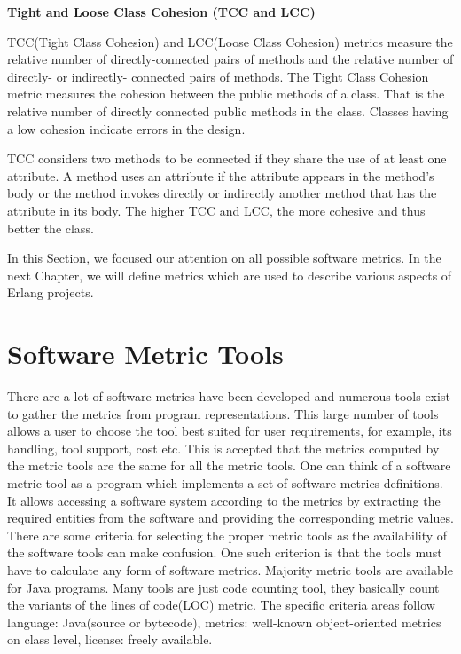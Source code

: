 \textbf{Tight and Loose Class Cohesion (TCC and LCC)}

TCC(Tight Class Cohesion) and LCC(Loose Class Cohesion) metrics measure the relative number of directly-connected pairs of methods and the relative number of directly- or indirectly- connected pairs of methods.
The Tight Class Cohesion metric measures the cohesion between the public methods of a class. That is the relative number of directly connected public methods in the class. Classes having a low cohesion indicate errors in the design.

TCC considers two methods to be connected if they share the use of at least one attribute. A method uses an attribute if the attribute appears in the method’s body or the method invokes directly or indirectly another method that has the attribute in its body. The higher TCC and LCC, the more cohesive and thus better the class.

In this Section, we focused our attention on all possible software metrics. In the next Chapter, we will define metrics which are used to describe various aspects of Erlang projects. 

\section{Software Metric Tools}
There are a lot of software metrics have been developed and numerous tools exist to gather the metrics from program representations. This large number of tools allows a user to choose the tool best suited for user requirements, for example, its handling, tool support, cost etc. This is accepted that the metrics computed by the metric tools are the same for all the metric tools. One can think of a software metric tool as a program which implements a set of software metrics definitions. It allows accessing a software system according to the metrics by extracting the required entities from the software and providing the corresponding metric values. There are
some criteria for selecting the proper metric tools as the availability of the software tools can make confusion. One such criterion is that the tools must have to calculate any form of software metrics. Majority metric tools are available for Java programs. Many tools are just code counting
tool, they basically count the variants of the lines of code(LOC) metric. The specific criteria areas follow language: Java(source or bytecode), metrics: well-known object-oriented metrics on class level, license: freely available.

